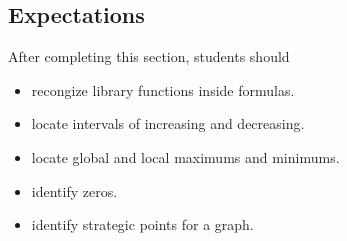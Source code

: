 \documentclass{ximera}
\begin{document}
\subsection{Expectations}

\begin{sectionOutcomes}
After completing this section, students should 

\begin{itemize}
\item recongize library functions inside formulas.
\item locate intervals of increasing and decreasing.
\item locate global and local maximums and minimums.
\item identify zeros.
\item identify strategic points for a graph.
\end{itemize}
\end{sectionOutcomes}
\end{document}
